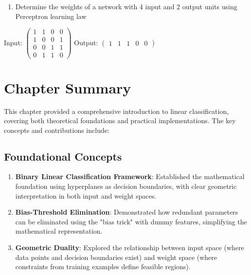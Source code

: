 \begin{enumerate}
    \item Determine the weights of a network with 4 input and 2 output units using Perceptron learning law
\end{enumerate}
Input:
\(\begin{pmatrix} 1 & 1 & 0 & 0 \\ 1 & 0 & 0 & 1 \\ 0 & 0 & 1 & 1 \\ 0 & 1 & 1 & 0 \end{pmatrix}\)
Output:
\( \begin{pmatrix} 1& 1 & 1 & 0 & 0 \end{pmatrix} \)

\section{Chapter Summary}

This chapter provided a comprehensive introduction to linear classification, covering both theoretical foundations and practical implementations. The key concepts and contributions include:

\subsection{Foundational Concepts}
\begin{enumerate}
    \item \textbf{Binary Linear Classification Framework}: Established the mathematical foundation using hyperplanes as decision boundaries, with clear geometric interpretation in both input and weight spaces.
    
    \item \textbf{Bias-Threshold Elimination}: Demonstrated how redundant parameters can be eliminated using the "bias trick" with dummy features, simplifying the mathematical representation.
    
    \item \textbf{Geometric Duality}: Explored the relationship between input space (where data points and decision boundaries exist) and weight space (where constraints from training examples define feasible regions).
\end{enumerate}


